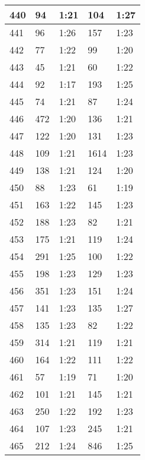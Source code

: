 \begin{center}
\begin{longtable}{|p{2cm}|l|l|l|l|}
440	&   94            &  1:21  &		104     	& 1:27 \\ \hline
441	&   96            &  1:26  &		157     	& 1:23 \\ \hline
442	&   77            &  1:22  &		99      	& 1:20 \\ \hline
443	&   45            &  1:21  &		60          & 1:22 \\ \hline
444	&   92            &  1:17  &		193     	& 1:25 \\ \hline
445	&   74            &  1:21  &		87      	& 1:24 \\ \hline
446	&   472           &  1:20  &		136     	& 1:21 \\ \hline
447	&   122           &  1:20  &		131     	& 1:23 \\ \hline
448	&   109           &  1:21  &		1614    	& 1:23 \\ \hline
449	&   138           &  1:21  &		124     	& 1:20 \\ \hline
450	&   88            &  1:23  &		61      	& 1:19 \\ \hline
451	&   163           &  1:22  &		145     	& 1:23 \\ \hline
452	&   188           &  1:23  &		82      	& 1:21 \\ \hline
453	&   175           &  1:21  &		119     	& 1:24 \\ \hline
454	&   291           &  1:25  &		100     	& 1:22 \\ \hline
455	&   198           &  1:23  &		129     	& 1:23 \\ \hline
456	&   351           &  1:23  &		151         & 1:24 \\ \hline
457	&   141           &  1:23  &		135     	& 1:27 \\ \hline
458	&   135           &  1:23  &		82      	& 1:22 \\ \hline
459	&   314           &  1:21  &		119     	& 1:21 \\ \hline
460	&   164           &  1:22  &		111     	& 1:22 \\ \hline
461	&   57            &  1:19  &		71      	& 1:20 \\ \hline
462	&   101           &  1:21  &		145     	& 1:21 \\ \hline
463	&   250           &  1:22  &		192     	& 1:23 \\ \hline
464	&   107           &  1:23  &		245     	& 1:21 \\ \hline
465	&   212           &  1:24  &		846     	& 1:25 \\ \hline

\end{longtable}
\end{center}
